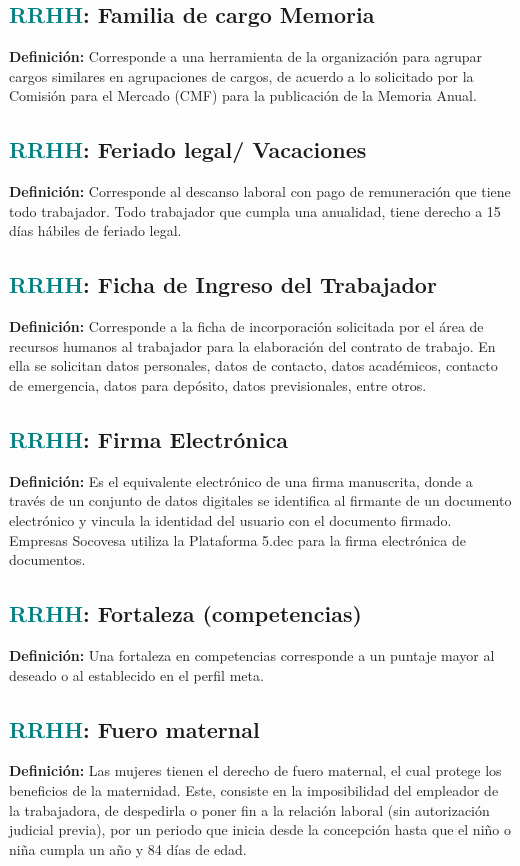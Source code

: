 \documentclass[12pt]{article}
\begin{document}
\subsection{\textcolor{teal}{RRHH}: Familia de cargo Memoria}
\textbf{Definición:} Corresponde a una herramienta de la organización para agrupar cargos similares en agrupaciones de cargos, de acuerdo a lo solicitado por la Comisión para el Mercado (CMF) para la publicación de la Memoria Anual. 
\subsection{\textcolor{teal}{RRHH}: Feriado legal/ Vacaciones}
\textbf{Definición:} Corresponde al descanso laboral con pago de remuneración que tiene todo trabajador. Todo trabajador que cumpla una anualidad, tiene derecho a 15 días hábiles de feriado legal.
\subsection{\textcolor{teal}{RRHH}: Ficha de Ingreso del Trabajador}
\textbf{Definición:} Corresponde a la ficha de incorporación solicitada por el área de recursos humanos al trabajador para la elaboración del contrato de trabajo. En ella se solicitan datos personales, datos de contacto, datos académicos, contacto de emergencia, datos para depósito, datos previsionales, entre otros.
\subsection{\textcolor{teal}{RRHH}: Firma Electrónica}
\textbf{Definición:} Es el equivalente electrónico de una firma manuscrita, donde a través de un conjunto de datos digitales se identifica al firmante de un documento electrónico y vincula la identidad del usuario con el documento firmado. Empresas Socovesa utiliza la Plataforma 5.dec para la firma electrónica de documentos.
\subsection{\textcolor{teal}{RRHH}: Fortaleza (competencias)}
\textbf{Definición:} Una fortaleza en competencias corresponde a un puntaje mayor al deseado o al establecido en el perfil meta.

\subsection{\textcolor{teal}{RRHH}: Fuero maternal}
\textbf{Definición:} Las mujeres tienen el derecho de fuero maternal, el cual protege los beneficios de la maternidad. Este, consiste en la imposibilidad del empleador de la trabajadora, de despedirla o poner fin a la relación laboral (sin autorización judicial previa), por un periodo que inicia desde la concepción hasta que el niño o niña cumpla un año y 84 días de edad.
\end{document}
